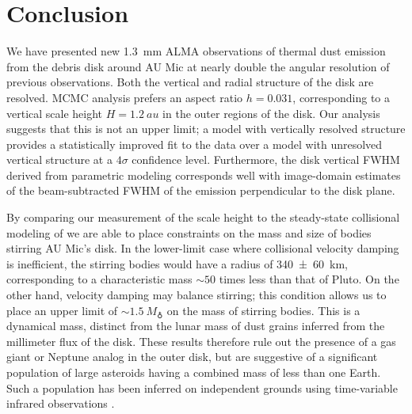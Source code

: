 \documentclass[modern]{aastex62}
\begin{document}
\section{Conclusion}
\label{section: conclusion}

We have presented new \SI{1.3}{mm} ALMA observations of thermal dust emission from the debris disk around AU Mic at nearly double the angular resolution of previous observations. 
Both the vertical and radial structure of the disk are resolved.
MCMC analysis prefers an aspect ratio $h = 0.031$, corresponding to a vertical scale height $H = \SI{1.2}{au}$ in the outer regions of the disk.
Our analysis suggests that this is not an upper limit; a model with vertically resolved structure provides a statistically improved fit to the data over a model with unresolved vertical structure at a $4 \sigma$ confidence level.
Furthermore, the disk vertical FWHM derived from parametric modeling corresponds well with image-domain estimates of the beam-subtracted FWHM of the emission perpendicular to the disk plane.

By comparing our measurement of the scale height to the steady-state collisional modeling of \cite{pan&schlichting12} we are able to place constraints on the mass and size of bodies stirring AU Mic's disk.
In the lower-limit case where collisional velocity damping is inefficient, the stirring bodies would have a radius of \SI{340 \pm 60}{km}, corresponding to a characteristic mass $\sim 50$ times less than that of Pluto.
On the other hand, velocity damping may balance stirring; this condition allows us to place an upper limit of $\sim \SI{1.5}{M_\earth}$ on the mass of stirring bodies.
This is a dynamical mass, distinct from the lunar mass of dust grains inferred from the millimeter flux of the disk.
These results therefore rule out the presence of a gas giant or Neptune analog in the outer disk, but are suggestive of a significant 
population of large asteroids 
having a combined mass of less than one Earth. Such a population has been inferred on independent
grounds using time-variable infrared observations \citep{chiang&fung17}.
\end{document}
